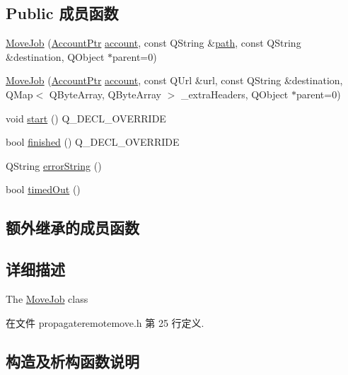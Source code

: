 \subsection*{Public 成员函数}
\begin{DoxyCompactItemize}
\item 
\hyperlink{class_o_c_c_1_1_move_job_a21b1a5d10fd1b6edff573d716c3eaef3}{Move\+Job} (\hyperlink{namespace_o_c_c_a848616aedb9188e223c6b9867757fe69}{Account\+Ptr} \hyperlink{class_o_c_c_1_1_abstract_network_job_a469c9d8212a338ad07d1efa1a94f784d}{account}, const Q\+String \&\hyperlink{class_o_c_c_1_1_abstract_network_job_a8ed2423a454ec861c20f6900f5591ef7}{path}, const Q\+String \&destination, Q\+Object $\ast$parent=0)
\item 
\hyperlink{class_o_c_c_1_1_move_job_a49524ca05a8c6e8ffc4518aec27a2b01}{Move\+Job} (\hyperlink{namespace_o_c_c_a848616aedb9188e223c6b9867757fe69}{Account\+Ptr} \hyperlink{class_o_c_c_1_1_abstract_network_job_a469c9d8212a338ad07d1efa1a94f784d}{account}, const Q\+Url \&url, const Q\+String \&destination, Q\+Map$<$ Q\+Byte\+Array, Q\+Byte\+Array $>$ \+\_\+extra\+Headers, Q\+Object $\ast$parent=0)
\item 
void \hyperlink{class_o_c_c_1_1_move_job_a0f963be47342b15bed2d961f743d0984}{start} () Q\+\_\+\+D\+E\+C\+L\+\_\+\+O\+V\+E\+R\+R\+I\+DE
\item 
bool \hyperlink{class_o_c_c_1_1_move_job_a2cea82684a6f32d91245b8e974f516dd}{finished} () Q\+\_\+\+D\+E\+C\+L\+\_\+\+O\+V\+E\+R\+R\+I\+DE
\item 
Q\+String \hyperlink{class_o_c_c_1_1_move_job_aa935a13a2c6d5007f17fb9cd2e172144}{error\+String} ()
\item 
bool \hyperlink{class_o_c_c_1_1_move_job_ae8d108c5175b52a3b2c913172dcfdd08}{timed\+Out} ()
\end{DoxyCompactItemize}
\subsection*{额外继承的成员函数}


\subsection{详细描述}
The \hyperlink{class_o_c_c_1_1_move_job}{Move\+Job} class 

在文件 propagateremotemove.\+h 第 25 行定义.



\subsection{构造及析构函数说明}
\mbox{\label{class_o_c_c_1_1_move_job_a21b1a5d10fd1b6edff573d716c3eaef3}} 
